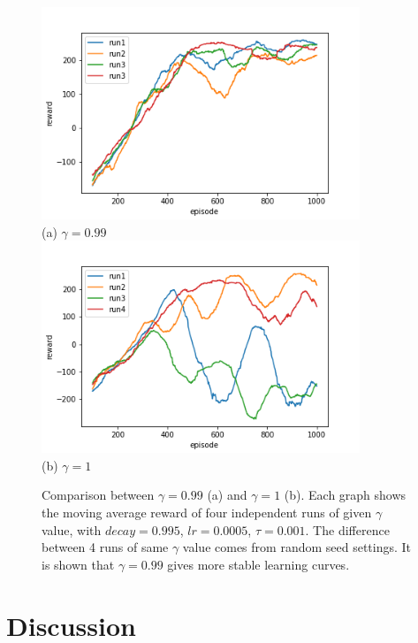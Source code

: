 \documentclass[conference]{IEEEtran}
\begin{document}
\begin{figure}
	\includegraphics[height=2.5in]{figures/gamma099.png}  \\ 
	\centering (a) $\gamma=0.99$\\
	\includegraphics[height=2.5in]{figures/gamma1.png}  \\ 
	\centering (b)  $\gamma=1$
	\caption{Comparison between $\gamma=0.99$ (a) and $\gamma=1$ (b). Each graph shows the moving average reward of four independent runs of given $\gamma$ value, with $decay=0.995$, $lr=0.0005$, $\tau=0.001$. The difference between 4 runs of same $\gamma$ value comes from random seed settings. It is shown that $\gamma=0.99$ gives more stable learning curves.}
	\label{fig:tau}
\end{figure}
	
\section{Discussion}


	


\end{document}
